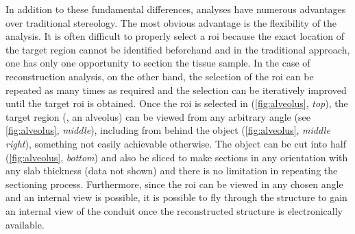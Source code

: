 In addition to these fundamental differences, \threed analyses have numerous advantages over traditional stereology. The most obvious advantage is the flexibility of the analysis. It is often difficult to properly select a \ac{roi} because the exact location of the target region cannot be identified beforehand and in the traditional approach, one has only one opportunity to section the tissue sample. In the case of \threed reconstruction analysis, on the other hand, the selection of the \ac{roi} can be repeated as many times as required and the selection can be iteratively improved until the target \ac{roi} is obtained. Once the \ac{roi} is selected in \threed (\autoref{fig:alveolus}, \textit{top}), the target region (\eg, an alveolus) can be viewed from any arbitrary angle (see \autoref{fig:alveolus}, \textit{middle}), including from behind the object (\autoref{fig:alveolus}, \textit{middle right}), something not easily achievable otherwise. The \threed object can be cut into half (\autoref{fig:alveolus}, \textit{bottom}) and also be sliced to make \twod sections in any orientation with any slab thickness (data not shown) and there is no limitation in repeating the sectioning process. Furthermore, since the \ac{roi} can be viewed in any chosen angle and an internal view is possible, it is possible to fly through the structure to gain an internal view of the conduit once the \threed reconstructed structure is electronically available.

